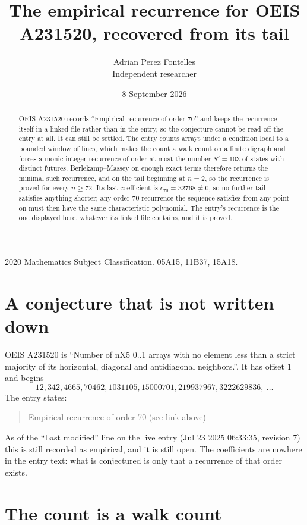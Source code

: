\documentclass[11pt,a4paper]{article}
\title{The empirical recurrence for OEIS A231520, recovered from its tail}
\author{Adrian Perez Fontelles\\ \small Independent researcher}
\date{8 September 2026}
\theoremstyle{plain}
\theoremstyle{definition}
\begin{document}
\maketitle

\begin{abstract}
OEIS A231520 records ``Empirical recurrence of order $70$'' and keeps the recurrence itself in
a linked file rather than in the entry, so the conjecture cannot be read off the entry at all.
It can still be settled. The entry counts arrays under a condition local to a bounded window of
lines, which makes the count a walk count on a finite digraph and forces a monic integer
recurrence of order at most the number $S'=103$ of states with distinct futures. Berlekamp--Massey on
enough exact terms therefore returns the minimal such recurrence, and on the tail beginning at $n=2$, so the recurrence is proved for every $n\ge72$.
Its last coefficient is $c_{70}=32768\neq0$, so no further tail satisfies anything
shorter; any order-$70$ recurrence the sequence satisfies from any point on must then have
the same characteristic polynomial. The entry's recurrence is the one displayed here, whatever
its linked file contains, and it is proved.
\end{abstract}

\noindent\small 2020 Mathematics Subject Classification. 05A15, 11B37, 15A18.\normalsize

\section{A conjecture that is not written down}

OEIS A231520 is ``Number of nX5 0..1 arrays with no element less than a strict majority of its horizontal, diagonal and antidiagonal neighbors.''. It has offset $1$ and begins
\[
12, 342, 4665, 70462, 1031105, 15000701, 219937967, 3222629836,\ \dots
\]
The entry states:
\begin{quote}
Empirical recurrence of order 70 (see link above)
\end{quote}
As of the ``Last modified'' line on the live entry (Jul 23 2025 06:33:35, revision 7)
this is still recorded as empirical, and it is still open. The coefficients are nowhere in the
entry text: what is conjectured is only that a recurrence of that order exists.

\section{The count is a walk count}
\end{document}

